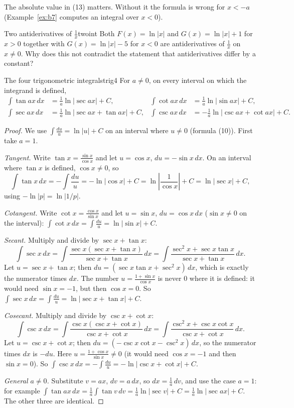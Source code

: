 \documentclass[11pt]{article}
\begin{document}
The absolute value in (13) matters. Without it the formula is wrong for $x<-a$ (Example~\ref{ex:b7} computes an integral over $x<0$).

\begin{think}{Two antiderivatives of $\frac1x$}{twoint}
Both $F(x)=\ln\lvert x\rvert$ and $G(x)=\ln\lvert x\rvert+1$ for $x>0$ together with $G(x)=\ln\lvert x\rvert-5$ for $x<0$ are antiderivatives of $\frac1x$ on $x\ne0$. Why does this not contradict the statement that antiderivatives differ by a constant?
\end{think}

\begin{thm}{The four trigonometric integrals}{trig4}
For $a\ne0$, on every interval on which the integrand is defined,
\begin{align*}
\int\tan ax\,dx&=\frac1a\ln\lvert\sec ax\rvert+C, & \int\cot ax\,dx&=\frac1a\ln\lvert\sin ax\rvert+C,\\
\int\sec ax\,dx&=\frac1a\ln\lvert\sec ax+\tan ax\rvert+C, & \int\csc ax\,dx&=-\frac1a\ln\lvert\csc ax+\cot ax\rvert+C .
\end{align*}
\end{thm}
\begin{proof}
We use $\int\frac{du}{u}=\ln\lvert u\rvert+C$ on an interval where $u\ne0$ (formula (10)). First take $a=1$.

\emph{Tangent.} Write $\tan x=\frac{\sin x}{\cos x}$ and let $u=\cos x$, $du=-\sin x\,dx$. On an interval where $\tan x$ is defined, $\cos x\ne0$, so
\[\int\tan x\,dx=-\int\frac{du}u=-\ln\lvert\cos x\rvert+C=\ln\left\lvert\frac1{\cos x}\right\rvert+C=\ln\lvert\sec x\rvert+C,\]
using $-\ln\lvert p\rvert=\ln\lvert1/p\rvert$.

\emph{Cotangent.} Write $\cot x=\frac{\cos x}{\sin x}$ and let $u=\sin x$, $du=\cos x\,dx$ ($\sin x\ne0$ on the interval): $\int\cot x\,dx=\int\frac{du}u=\ln\lvert\sin x\rvert+C$.

\emph{Secant.} Multiply and divide by $\sec x+\tan x$:
\[\int\sec x\,dx=\int\frac{\sec x(\sec x+\tan x)}{\sec x+\tan x}\,dx=\int\frac{\sec^2x+\sec x\tan x}{\sec x+\tan x}\,dx .\]
Let $u=\sec x+\tan x$; then $du=(\sec x\tan x+\sec^2x)\,dx$, which is exactly the numerator times $dx$. The number $u=\frac{1+\sin x}{\cos x}$ is never $0$ where it is defined: it would need $\sin x=-1$, but then $\cos x=0$. So $\int\sec x\,dx=\int\frac{du}u=\ln\lvert\sec x+\tan x\rvert+C$.

\emph{Cosecant.} Multiply and divide by $\csc x+\cot x$:
\[\int\csc x\,dx=\int\frac{\csc x(\csc x+\cot x)}{\csc x+\cot x}\,dx=\int\frac{\csc^2x+\csc x\cot x}{\csc x+\cot x}\,dx .\]
Let $u=\csc x+\cot x$; then $du=(-\csc x\cot x-\csc^2x)\,dx$, so the numerator times $dx$ is $-du$. Here $u=\frac{1+\cos x}{\sin x}\ne0$ (it would need $\cos x=-1$ and then $\sin x=0$). So $\int\csc x\,dx=-\int\frac{du}u=-\ln\lvert\csc x+\cot x\rvert+C$.

\emph{General $a\ne0$.} Substitute $v=ax$, $dv=a\,dx$, so $dx=\frac1a\,dv$, and use the case $a=1$: for example $\int\tan ax\,dx=\frac1a\int\tan v\,dv=\frac1a\ln\lvert\sec v\rvert+C=\frac1a\ln\lvert\sec ax\rvert+C$. The other three are identical.
\end{proof}
\end{document}
